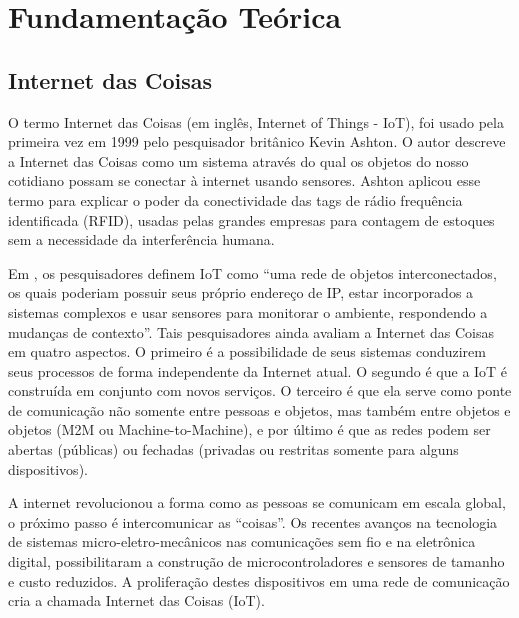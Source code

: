 
\chapter{Fundamentação Teórica}

\section{Internet das Coisas}

O termo Internet das Coisas (em inglês, Internet of Things - IoT),
foi usado pela primeira vez em 1999 pelo pesquisador britânico Kevin
Ashton\cite{Ashton2009}. O autor descreve a Internet das Coisas como
um sistema através do qual os objetos do nosso cotidiano possam se
conectar à internet usando sensores. Ashton aplicou esse termo para
explicar o poder da conectividade das tags de rádio frequência identificada
(RFID), usadas pelas grandes empresas para contagem de estoques sem
a necessidade da interferência humana.

Em \cite{santos2014}, os pesquisadores definem IoT como “uma rede
de objetos interconectados, os quais poderiam possuir seus próprio
endereço de IP, estar incorporados a sistemas complexos e usar sensores
para monitorar o ambiente, respondendo a mudanças de contexto”. Tais
pesquisadores ainda avaliam a Internet das Coisas em quatro aspectos.
O primeiro é a possibilidade de seus sistemas conduzirem seus processos
de forma independente da Internet atual. O segundo é que a IoT é construída
em conjunto com novos serviços. O terceiro é que ela serve como ponte
de comunicação não somente entre pessoas e objetos, mas também entre
objetos e objetos (M2M ou Machine-to-Machine), e por último é que
as redes podem ser abertas (públicas) ou fechadas (privadas ou restritas
somente para alguns dispositivos).

A internet revolucionou a forma como as pessoas se comunicam em escala
global, o próximo passo é intercomunicar as ``coisas''. Os recentes
avanços na tecnologia de sistemas micro-eletro-mecânicos nas comunicações
sem fio e na eletrônica digital, possibilitaram a construção de microcontroladores
e sensores de tamanho e custo reduzidos. A proliferação destes dispositivos
em uma rede de comunicação cria a chamada Internet das Coisas (IoT).

